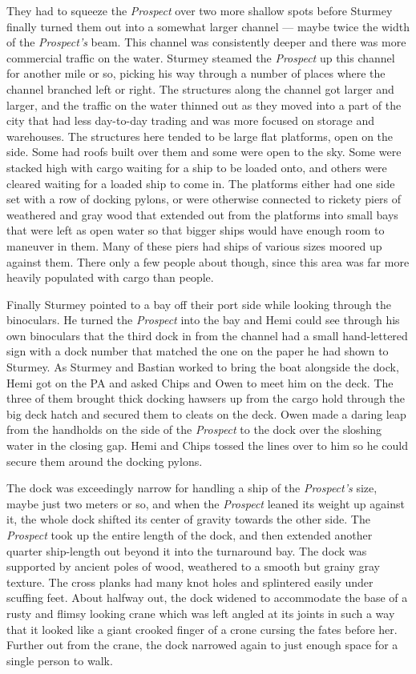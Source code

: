 \documentclass[]{scrbook}
\begin{document}
They had to squeeze the \emph{Prospect} over two more shallow spots
before Sturmey finally turned them out into a somewhat larger channel
--- maybe twice the width of the \emph{Prospect's} beam. This channel
was consistently deeper and there was more commercial traffic on the
water. Sturmey steamed the \emph{Prospect} up this channel for another
mile or so, picking his way through a number of places where the channel
branched left or right. The structures along the channel got larger and
larger, and the traffic on the water thinned out as they moved into a
part of the city that had less day-to-day trading and was more focused
on storage and warehouses. The structures here tended to be large flat
platforms, open on the side. Some had roofs built over them and some
were open to the sky. Some were stacked high with cargo waiting for a
ship to be loaded onto, and others were cleared waiting for a loaded
ship to come in. The platforms either had one side set with a row of
docking pylons, or were otherwise connected to rickety piers of
weathered and gray wood that extended out from the platforms into small
bays that were left as open water so that bigger ships would have enough
room to maneuver in them. Many of these piers had ships of various sizes
moored up against them. There only a few people about though, since this
area was far more heavily populated with cargo than people.

Finally Sturmey pointed to a bay off their port side while looking
through the binoculars. He turned the \emph{Prospect} into the bay and
Hemi could see through his own binoculars that the third dock in from
the channel had a small hand-lettered sign with a dock number that
matched the one on the paper he had shown to Sturmey. As Sturmey and
Bastian worked to bring the boat alongside the dock, Hemi got on the PA
and asked Chips and Owen to meet him on the deck. The three of them
brought thick docking hawsers up from the cargo hold through the big
deck hatch and secured them to cleats on the deck. Owen made a daring
leap from the handholds on the side of the \emph{Prospect} to the dock
over the sloshing water in the closing gap. Hemi and Chips tossed the
lines over to him so he could secure them around the docking pylons.

The dock was exceedingly narrow for handling a ship of the
\emph{Prospect's} size, maybe just two meters or so, and when the
\emph{Prospect} leaned its weight up against it, the whole dock shifted
its center of gravity towards the other side. The \emph{Prospect} took
up the entire length of the dock, and then extended another quarter
ship-length out beyond it into the turnaround bay. The dock was
supported by ancient poles of wood, weathered to a smooth but grainy
gray texture. The cross planks had many knot holes and splintered easily
under scuffing feet. About halfway out, the dock widened to accommodate
the base of a rusty and flimsy looking crane which was left angled at
its joints in such a way that it looked like a giant crooked finger of a
crone cursing the fates before her. Further out from the crane, the dock
narrowed again to just enough space for a single person to walk.
\end{document}
